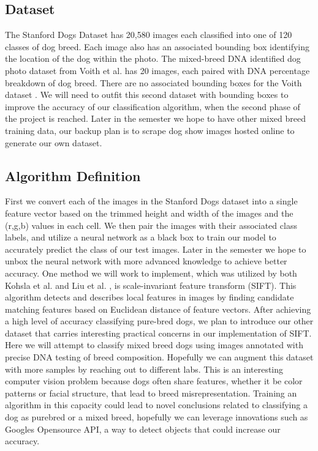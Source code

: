 \documentclass[12pt]{article}
\begin{document}
\subsection{Dataset}

The Stanford Dogs Dataset has 20,580 images each classified into one of 120 classes of dog breed. \cite{khosla2011novel} Each image also has an associated bounding box identifying the location of the dog within the photo. The mixed-breed DNA identified dog photo dataset from Voith et al. \cite{voith2009comparison} has 20 images, each paired with DNA percentage breakdown of dog breed. There are no associated bounding boxes for the Voith dataset \cite{voith2009comparison}. We will need to outfit this second dataset with bounding boxes to improve the accuracy of our classification algorithm, when the second phase of the project is reached. Later in the semester we hope to have other mixed breed training data, our backup plan is to scrape dog show images hosted online to generate our own dataset. 

\subsection{Algorithm Definition}

First we convert each of the images in the Stanford Dogs dataset \cite{khosla2011novel} into a single feature vector based on the trimmed height and width of the images and the (r,g,b) values in each cell. We  then pair the images with their associated class labels, and utilize a neural network as a black box to train our model to accurately predict the class of our test images. Later in the semester we hope to unbox the neural network with more advanced knowledge to achieve better accuracy. One method we will work to implement, which was utilized by both Kohsla et al. \cite{khosla2011novel} and Liu et al. \cite{liu2012dog}, is scale-invariant feature transform (SIFT). This algorithm detects and describes local features in images by finding candidate matching features based on Euclidean distance of feature vectors.  \cite{lowe2004distinctive} After achieving a high level of accuracy classifying pure-bred dogs, we plan to introduce our other dataset \cite{voith2009comparison} that carries interesting practical concerns in our implementation of SIFT. Here we will attempt to classify mixed breed dogs using images annotated with precise DNA testing of breed composition. Hopefully we can augment this dataset with more samples by reaching out to different labs. This is an interesting computer vision problem because dogs often share features, whether it be color patterns or facial structure, that lead to breed misrepresentation.  Training an algorithm in this capacity could lead to novel conclusions related to classifying a dog as purebred or a mixed breed, hopefully we can leverage innovations such as Googles Opensource API, a way to detect objects that could increase our accuracy. 
 
\end{document}
